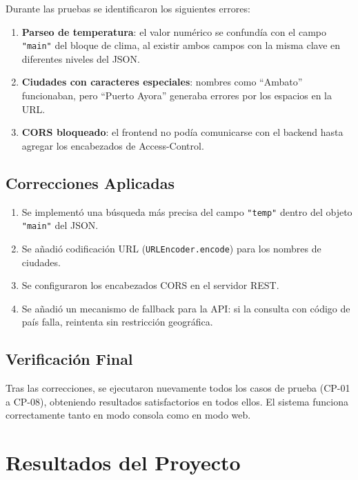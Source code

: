 \documentclass[conference]{IEEEtran}
\begin{document}
Durante las pruebas se identificaron los siguientes errores:

\begin{enumerate}
    \item \textbf{Parseo de temperatura}: el valor numérico se confundía con el campo \texttt{"main"} del bloque de clima, al existir ambos campos con la misma clave en diferentes niveles del JSON.
    \item \textbf{Ciudades con caracteres especiales}: nombres como ``Ambato'' funcionaban, pero ``Puerto Ayora'' generaba errores por los espacios en la URL.
    \item \textbf{CORS bloqueado}: el frontend no podía comunicarse con el backend hasta agregar los encabezados de Access-Control.
\end{enumerate}

\subsection{Correcciones Aplicadas}

\begin{enumerate}
    \item Se implementó una búsqueda más precisa del campo \texttt{"temp"} dentro del objeto \texttt{"main"} del JSON.
    \item Se añadió codificación URL (\texttt{URLEncoder.encode}) para los nombres de ciudades.
    \item Se configuraron los encabezados CORS en el servidor REST.
    \item Se añadió un mecanismo de fallback para la API: si la consulta con código de país falla, reintenta sin restricción geográfica.
\end{enumerate}

\subsection{Verificación Final}

Tras las correcciones, se ejecutaron nuevamente todos los casos de prueba (CP-01 a CP-08), obteniendo resultados satisfactorios en todos ellos. El sistema funciona correctamente tanto en modo consola como en modo web.


\section{Resultados del Proyecto}
\end{document}
